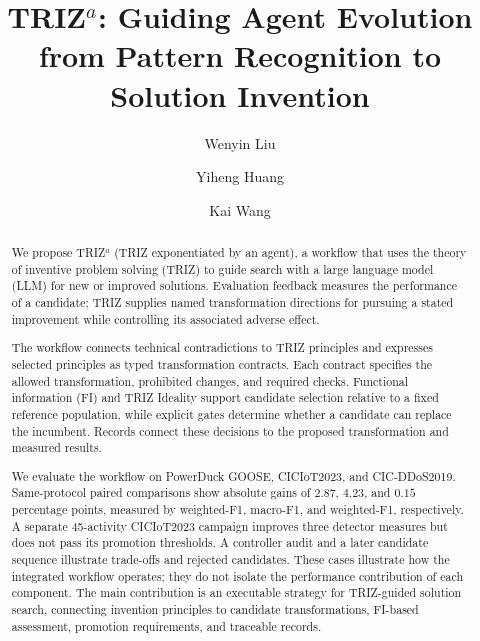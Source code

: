 \documentclass[sigconf]{acmart}
\begin{document}
\newcommand{\triza}{TRIZ$^a$}
\newcommand{\papertitle}{\triza: Guiding Agent Evolution from Pattern Recognition to Solution Invention}
\newcommand{\complete}{\textcolor{trizgreen}{\textbf{complete}}}
\newcommand{\withheld}{\textcolor{trizmagenta}{\textbf{not promoted}}}

\title[TRIZ-Guided Agent Solution Development]{\papertitle}


\author{Wenyin Liu}

\author{Yiheng Huang}

\author{Kai Wang}

\renewcommand{\shortauthors}{Liu et al.}

\begin{abstract}
We propose \triza{} (TRIZ exponentiated by an agent), a workflow that uses the theory of inventive problem solving (TRIZ) to guide search with a large language model (LLM) for new or improved solutions. Evaluation feedback measures the performance of a candidate; TRIZ supplies named transformation directions for pursuing a stated improvement while controlling its associated adverse effect.

The workflow connects technical contradictions to TRIZ principles and expresses selected principles as typed transformation contracts. Each contract specifies the allowed transformation, prohibited changes, and required checks. Functional information (FI) and TRIZ Ideality support candidate selection relative to a fixed reference population, while explicit gates determine whether a candidate can replace the incumbent. Records connect these decisions to the proposed transformation and measured results.

We evaluate the workflow on PowerDuck GOOSE, CICIoT2023, and CIC-DDoS2019. Same-protocol paired comparisons show absolute gains of $2.87$, $4.23$, and $0.15$ percentage points, measured by weighted-F1, macro-F1, and weighted-F1, respectively. A separate 45-activity CICIoT2023 campaign improves three detector measures but does not pass its promotion thresholds. A controller audit and a later candidate sequence illustrate trade-offs and rejected candidates. These cases illustrate how the integrated workflow operates; they do not isolate the performance contribution of each component. The main contribution is an executable strategy for TRIZ-guided solution search, connecting invention principles to candidate transformations, FI-based assessment, promotion requirements, and traceable records.
\end{abstract}
\end{document}
